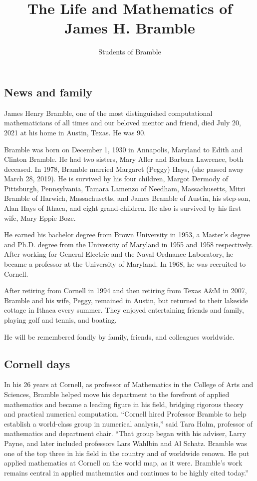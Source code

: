 \documentclass[CJK,11pt]{amsart}
\theoremstyle{definition}
\begin{document}
\begin{CJK*}{UTF8}{gbsn}
\title{
The Life and Mathematics of James H. Bramble
}
\author{Students of Bramble}
\maketitle

\section{News and family}
James Henry Bramble, one of the most distinguished computational mathematicians of all times and our beloved mentor and friend, died July 20, 2021 at his home in Austin, Texas. He was 90.

Bramble was born on December 1, 1930 in Annapolis, Maryland to Edith and Clinton Bramble. He had two sisters, Mary Aller and Barbara Lawrence, both deceased. 
In 1978, Bramble married Margaret (Peggy) Hays, (she passed away March 28, 2019). 
He is survived by his four children, Margot Dermody of Pittsburgh, Pennsylvania, Tamara Lamenzo of Needham, Massachusetts, Mitzi Bramble of Harwich, Massachusetts, and James Bramble of Austin, his step-son, Alan Hays of Ithaca, and eight grand-children. He also is survived by his first wife, Mary Eppie Boze. 

{ He earned his bachelor degree from Brown University in
  1953, a Master's degree and Ph.D. degree from the University of
  Maryland in 1955 and 1958 respectively.  After working for General
  Electric and the Naval Ordnance Laboratory, he became a professor at
  the University of Maryland.  In 1968, he was recruited to Cornell.}

After retiring from Cornell in 1994 and then retiring from Texas A\&M
in 2007, Bramble and his wife, Peggy, remained in Austin, but returned
to their lakeside cottage in Ithaca every summer.  They enjoyed
entertaining friends and family, playing golf and tennis, and boating.

He will be remembered fondly by family, friends, and colleagues worldwide.

\subsection{Cornell days}
In his 26 years at Cornell, as professor of Mathematics in the College of Arts and Sciences,  Bramble helped move his department to the forefront of applied mathematics and became a leading figure in his field, bridging rigorous theory and practical numerical computation.  “Cornell hired Professor Bramble to help establish a world-class group in numerical analysis,” said Tara Holm, professor of mathematics and department chair. “That group began with his adviser, Larry Payne, and later included professors Lars Wahlbin and Al Schatz. Bramble was one of the top three in his field in the country and of worldwide renown. He put applied mathematics at Cornell on the world map, as it were. Bramble's work remains central in applied mathematics and continues to be highly cited today.”


\end{CJK*}
\end{document}
